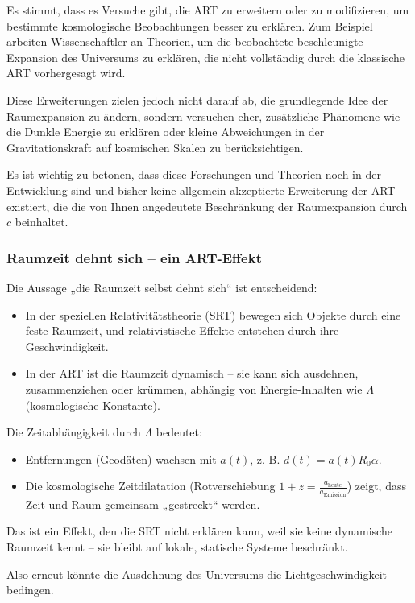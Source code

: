 \documentclass[a4paper,12pt]{article}
\begin{document}
	Es stimmt, dass es Versuche gibt, die ART zu erweitern oder zu modifizieren, um bestimmte kosmologische Beobachtungen besser zu erklären. Zum Beispiel arbeiten Wissenschaftler an Theorien, um die beobachtete beschleunigte Expansion des Universums zu erklären, die nicht vollständig durch die klassische ART vorhergesagt wird.
	
	Diese Erweiterungen zielen jedoch nicht darauf ab, die grundlegende Idee der Raumexpansion zu ändern, sondern versuchen eher, zusätzliche Phänomene wie die Dunkle Energie zu erklären oder kleine Abweichungen in der Gravitationskraft auf kosmischen Skalen zu berücksichtigen.
	
	Es ist wichtig zu betonen, dass diese Forschungen und Theorien noch in der Entwicklung sind und bisher keine allgemein akzeptierte Erweiterung der ART existiert, die die von Ihnen angedeutete Beschränkung der Raumexpansion durch \( c \) beinhaltet.
	
	\subsubsection{Raumzeit dehnt sich – ein ART-Effekt}
	Die Aussage „die Raumzeit selbst dehnt sich“ ist entscheidend:
	\begin{itemize}
		\item In der speziellen Relativitätstheorie (SRT) bewegen sich Objekte durch eine feste Raumzeit, und relativistische Effekte entstehen durch ihre Geschwindigkeit.
		\item In der ART ist die Raumzeit dynamisch – sie kann sich ausdehnen, zusammenziehen oder krümmen, abhängig von Energie-Inhalten wie \( \Lambda \) (kosmologische Konstante).
	\end{itemize}
	
	Die Zeitabhängigkeit durch \( \Lambda \) bedeutet:
	\begin{itemize}
		\item Entfernungen (Geodäten) wachsen mit \( a(t) \), z. B. \( d(t) = a(t) R_0 \alpha \).
		\item Die kosmologische Zeitdilatation (Rotverschiebung \( 1 + z = \frac{a_{\text{heute}}}{a_{\text{Emission}}} \)) zeigt, dass Zeit und Raum gemeinsam „gestreckt“ werden.
	\end{itemize}
	
	Das ist ein Effekt, den die SRT nicht erklären kann, weil sie keine dynamische Raumzeit kennt – sie bleibt auf lokale, statische Systeme beschränkt.
	
	Also erneut könnte die Ausdehnung des Universums die Lichtgeschwindigkeit bedingen.
	
\end{document}
